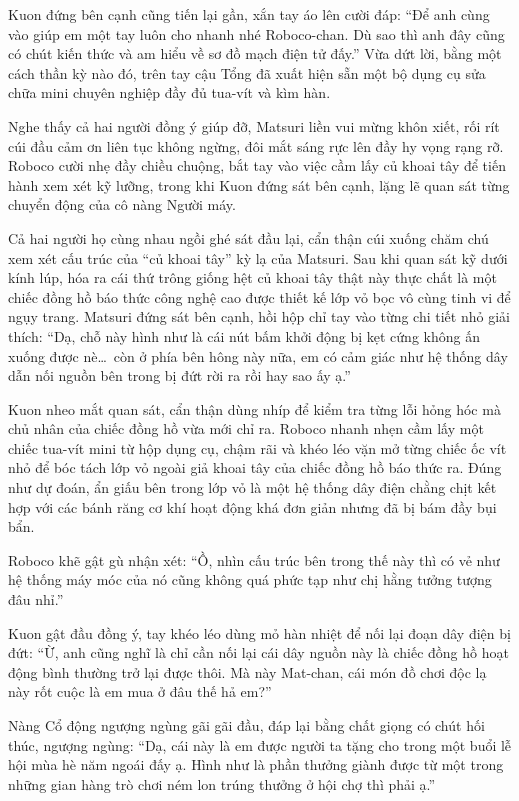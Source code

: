 \documentclass[../main.tex]{subfiles}
\begin{document}
Kuon đứng bên cạnh cũng tiến lại gần, xắn tay áo lên cười đáp: ``Để anh cùng vào giúp em một tay luôn cho nhanh nhé Roboco-chan. Dù sao thì anh đây cũng có chút kiến thức và am hiểu về sơ đồ mạch điện tử đấy.'' Vừa dứt lời, bằng một cách thần kỳ nào đó, trên tay cậu Tổng đã xuất hiện sẵn một bộ dụng cụ sửa chữa mini chuyên nghiệp đầy đủ tua-vít và kìm hàn.

Nghe thấy cả hai người đồng ý giúp đỡ, Matsuri liền vui mừng khôn xiết, rối rít cúi đầu cảm ơn liên tục không ngừng, đôi mắt sáng rực lên đầy hy vọng rạng rỡ. Roboco cười nhẹ đầy chiều chuộng, bắt tay vào việc cầm lấy củ khoai tây để tiến hành xem xét kỹ lưỡng, trong khi Kuon đứng sát bên cạnh, lặng lẽ quan sát từng chuyển động của cô nàng Người máy.

\ct

Cả hai người họ cùng nhau ngồi ghé sát đầu lại, cẩn thận cúi xuống chăm chú xem xét cấu trúc của ``củ khoai tây'' kỳ lạ của Matsuri. Sau khi quan sát kỹ dưới kính lúp, hóa ra cái thứ trông giống hệt củ khoai tây thật này thực chất là một chiếc đồng hồ báo thức công nghệ cao được thiết kế lớp vỏ bọc vô cùng tinh vi để ngụy trang. Matsuri đứng sát bên cạnh, hồi hộp chỉ tay vào từng chi tiết nhỏ giải thích: ``Dạ, chỗ này hình như là cái nút bấm khởi động bị kẹt cứng không ấn xuống được nè\dots\ còn ở phía bên hông này nữa, em có cảm giác như hệ thống dây dẫn nối nguồn bên trong bị đứt rời ra rồi hay sao ấy ạ.''

Kuon nheo mắt quan sát, cẩn thận dùng nhíp để kiểm tra từng lỗi hỏng hóc mà chủ nhân của chiếc đồng hồ vừa mới chỉ ra. Roboco nhanh nhẹn cầm lấy một chiếc tua-vít mini từ hộp dụng cụ, chậm rãi và khéo léo vặn mở từng chiếc ốc vít nhỏ để bóc tách lớp vỏ ngoài giả khoai tây của chiếc đồng hồ báo thức ra. Đúng như dự đoán, ẩn giấu bên trong lớp vỏ là một hệ thống dây điện chằng chịt kết hợp với các bánh răng cơ khí hoạt động khá đơn giản nhưng đã bị bám đầy bụi bẩn.

Roboco khẽ gật gù nhận xét: ``Ồ, nhìn cấu trúc bên trong thế này thì có vẻ như hệ thống máy móc của nó cũng không quá phức tạp như chị hằng tưởng tượng đâu nhỉ.''

Kuon gật đầu đồng ý, tay khéo léo dùng mỏ hàn nhiệt để nối lại đoạn dây điện bị đứt: ``Ừ, anh cũng nghĩ là chỉ cần nối lại cái dây nguồn này là chiếc đồng hồ hoạt động bình thường trở lại được thôi. Mà này Mat-chan, cái món đồ chơi độc lạ này rốt cuộc là em mua ở đâu thế hả em?''

Nàng Cổ động ngượng ngùng gãi gãi đầu, đáp lại bằng chất giọng có chút hối thúc, ngượng ngùng: ``Dạ, cái này là em được người ta tặng cho trong một buổi lễ hội mùa hè năm ngoái đấy ạ. Hình như là phần thưởng giành được từ một trong những gian hàng trò chơi ném lon trúng thưởng ở hội chợ thì phải ạ.''
\end{document}
